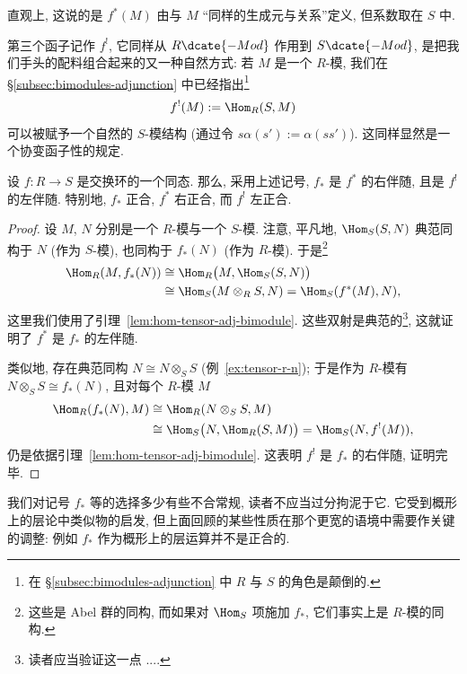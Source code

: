直观上, 这说的是 $f^*(M)$ 由与 $M$ ``同样的生成元与关系''定义, 但系数取在 $S$ 中.

第三个函子记作 $f^!$, 它同样从 $R\dcate{-Mod}$ 作用到 $S\dcate{-Mod}$, 是把我们手头的配料组合起来的又一种自然方式: 若 $M$ 是一个 $R$-模, 我们在 \S\ref{subsec:bimodules-adjunction} 中已经指出\footnote{在 \S\ref{subsec:bimodules-adjunction} 中 $R$ 与 $S$ 的角色是颠倒的.}
\[
f^!(M):=\Hom_R(S,M)
\]
可以被赋予一个自然的 $S$-模结构 (通过令 $s\alpha(s'):=\alpha(ss')$). 这同样显然是一个协变函子性的规定.

\begin{proposition}\label{prop:base-change-adjoints}
设 $f:R\to S$ 是交换环的一个同态. 那么, 采用上述记号, $f_*$ 是 $f^*$ 的右伴随, 且是 $f^!$ 的左伴随. 特别地, $f_*$ 正合, $f^*$ 右正合, 而 $f^!$ 左正合.
\end{proposition}

\begin{proof}
设 $M$, $N$ 分别是一个 $R$-模与一个 $S$-模. 注意, 平凡地, $\Hom_S(S,N)$ 典范同构于 $N$ (作为 $S$-模), 也同构于 $f_*(N)$ (作为 $R$-模). 于是\footnote{这些是 Abel 群的同构, 而如果对 $\Hom_S$ 项施加 $f_*$, 它们事实上是 $R$-模的同构.}
\[
\begin{aligned}
\Hom_R(M,f_*(N))&\cong\Hom_R\bigl(M,\Hom_S(S,N)\bigr)\\
&\cong\Hom_S(M\otimes_R S,N)=\Hom_S(f^*(M),N),
\end{aligned}
\]
这里我们使用了引理~\ref{lem:hom-tensor-adj-bimodule}. 这些双射是典范的\footnote{读者应当验证这一点 ....}, 这就证明了 $f^*$ 是 $f_*$ 的左伴随.

类似地, 存在典范同构 $N\cong N\otimes_S S$ (例~\ref{ex:tensor-r-n}); 于是作为 $R$-模有 $N\otimes_S S\cong f_*(N)$, 且对每个 $R$-模 $M$
\[
\begin{aligned}
\Hom_R(f_*(N),M)&\cong\Hom_R(N\otimes_S S,M)\\
&\cong\Hom_S\bigl(N,\Hom_R(S,M)\bigr)=\Hom_S(N,f^!(M)),
\end{aligned}
\]
仍是依据引理~\ref{lem:hom-tensor-adj-bimodule}. 这表明 $f^!$ 是 $f_*$ 的右伴随, 证明完毕.
\end{proof}

\begin{remark}[警告]\label{rmk:base-change-notation-warning}
我们对记号 $f_*$ 等的选择多少有些不合常规, 读者不应当过分拘泥于它. 它受到概形上的层论中类似物的启发, 但上面回顾的某些性质在那个更宽的语境中需要作关键的调整: 例如 $f_*$ 作为概形上的层运算并不是正合的.
\end{remark}

